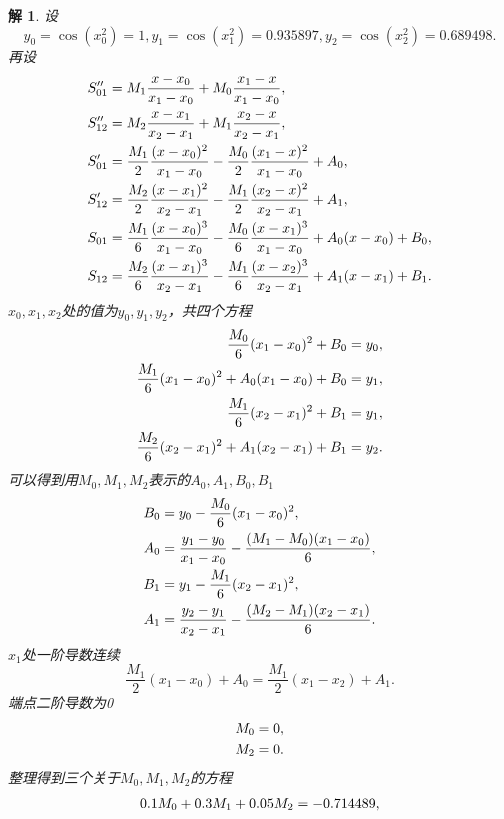 \documentclass[10pt]{ctexart}
\newtheorem*{solution}{解}
\begin{document}
\begin{solution}
    设
    $$y_0=\cos{(x_0^2)}=1,y_1=\cos{(x_1^2)}=0.935897,y_2=\cos{(x_2^2)}=0.689498.$$
    再设
    \begin{align}
        S_{01}''&=M_1\frac{x-x_0}{x_1-x_0}+M_0\frac{x_1-x}{x_1-x_0},\notag\\
        S_{12}''&=M_2\frac{x-x_1}{x_2-x_1}+M_1\frac{x_2-x}{x_2-x_1},\notag\\
        S_{01}'&=\frac{M_1}{2}\frac{(x-x_0)^2}{x_1-x_0}-\frac{M_0}{2}\frac{(x_1-x)^2}{x_1-x_0}+A_0,\notag\\
        S_{12}'&=\frac{M_2}{2}\frac{(x-x_1)^2}{x_2-x_1}-\frac{M_1}{2}\frac{(x_2-x)^2}{x_2-x_1}+A_1,\notag\\
        S_{01}&=\frac{M_1}{6}\frac{(x-x_0)^3}{x_1-x_0}-\frac{M_0}{6}\frac{(x-x_1)^3}{x_1-x_0}+A_0(x-x_0)+B_0,\notag\\
        S_{12}&=\frac{M_2}{6}\frac{(x-x_1)^3}{x_2-x_1}-\frac{M_1}{6}\frac{(x-x_2)^3}{x_2-x_1}+A_1(x-x_1)+B_1.\notag
    \end{align}
    $x_0,x_1,x_2$处的值为$y_0,y_1,y_2$，共四个方程
    \begin{align}
        \frac{M_0}{6}(x_1-x_0)^2+B_0=y_0,\notag\\
        \frac{M_1}{6}(x_1-x_0)^2+A_0(x_1-x_0)+B_0=y_1,\notag\\
        \frac{M_1}{6}(x_2-x_1)^2+B_1=y_1,\notag\\
        \frac{M_2}{6}(x_2-x_1)^2+A_1(x_2-x_1)+B_1=y_2.\notag
    \end{align}
    可以得到用$M_0,M_1,M_2$表示的$A_0,A_1,B_0,B_1$
    \begin{align}
        B_0&=y_0-\frac{M_0}{6}(x_1-x_0)^2,\notag\\
        A_0&=\frac{y_1-y_0}{x_1-x_0}-\frac{(M_1-M_0)(x_1-x_0)}{6},\notag\\
        B_1&=y_1-\frac{M_1}{6}(x_2-x_1)^2,\notag\\
        A_1&=\frac{y_2-y_1}{x_2-x_1}-\frac{(M_2-M_1)(x_2-x_1)}{6}.\notag
    \end{align}
    $x_1$处一阶导数连续
    $$\frac{M_1}{2}(x_1-x_0)+A_0=\frac{M_1}{2}(x_1-x_2)+A_1.$$
    端点二阶导数为0
    \begin{align}
        M_0&=0,\notag\\
        M_2&=0.\notag
    \end{align}
    整理得到三个关于$M_0,M_1,M_2$的方程
    \begin{align}
        0.1M_0+0.3M_1+0.05M_2&=-0.714489,\notag\\

\end{align}
\end{solution}
\end{document}
